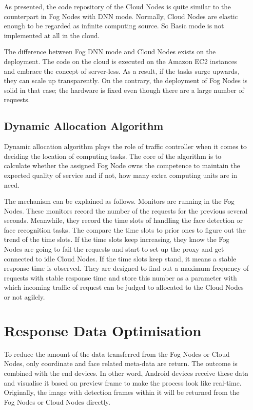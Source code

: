 As presented, the code repository of the Cloud Nodes is quite similar to the counterpart in Fog Nodes with DNN mode. Normally, Cloud Nodes are elastic enough to be regarded as infinite computing source. So Basic mode is not implemented at all in the cloud.

The difference between Fog DNN mode and Cloud Nodes exists on the deployment. The code on the cloud is executed on the Amazon EC2 instances and embrace the concept of server-less. As a result, if the tasks surge upwards, they can scale up transparently. On the contrary, the deployment of Fog Nodes is solid in that case; the hardware is fixed even though there are a large number of requests.

\subsection{Dynamic Allocation Algorithm}
Dynamic allocation algorithm plays the role of traffic controller when it comes to deciding the location of computing tasks. The core of the algorithm is to calculate whether the assigned Fog Node owns the competence to maintain the expected quality of service and if not, how many extra computing units are in need.

The mechanism can be explained as follows. Monitors are running in the Fog Nodes. These monitors record the number of the requests for the previous several seconds. Meanwhile, they record the time slots of handling the face detection or face recognition tasks. The compare the time slots to prior ones to figure out the trend of the time slots. If the time slots keep increasing, they know the Fog Nodes are going to fail the requests and start to set up the proxy and get connected to idle Cloud Nodes. If the time slots keep stand, it means a stable response time is observed. They are designed to find out a maximum frequency of requests with stable response time and store this number as a parameter with which incoming traffic of request can be judged to allocated to the Cloud Nodes or not agilely.

\section{Response Data Optimisation}
To reduce the amount of the data transferred from the Fog Nodes or Cloud Nodes, only coordinate and face related meta-data are return. The outcome is combined with the end devices. In other word, Android devices receive these data and visualise it based on preview frame to make the process look like real-time. Originally, the image with detection frames within it will be returned from the Fog Nodes or Cloud Nodes directly. 

